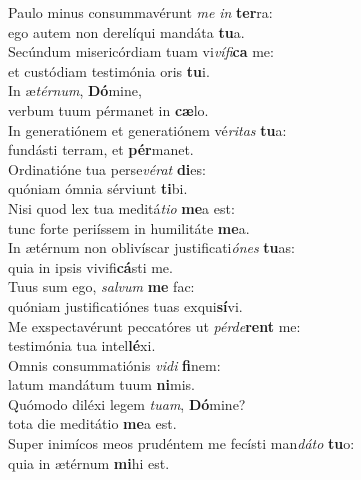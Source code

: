 \oddverse Paulo minus consummavérunt \textit{me} \textit{in} \textbf{ter}ra:~\*\\
\oddverse ego autem non derelíqui mandáta \textbf{tu}a.\\
\evenverse Secúndum misericórdiam tuam vi\textit{ví}\textit{fi}\textbf{ca} me:~\*\\
\evenverse et custódiam testimónia oris \textbf{tu}i.\\
\oddverse In æ\textit{tér}\textit{num}, \textbf{Dó}mine,~\*\\
\oddverse verbum tuum pérmanet in \textbf{cæ}lo.\\
\evenverse In generatiónem et generatiónem vé\textit{ri}\textit{tas} \textbf{tu}a:~\*\\
\evenverse fundásti terram, et \textbf{pér}manet.\\
\oddverse Ordinatióne tua perse\textit{vé}\textit{rat} \textbf{di}es:~\*\\
\oddverse quóniam ómnia sérviunt \textbf{ti}bi.\\
\evenverse Nisi quod lex tua meditá\textit{ti}\textit{o} \textbf{me}a est:~\*\\
\evenverse tunc forte periíssem in humilitáte \textbf{me}a.\\
\oddverse In ætérnum non oblivíscar justificati\textit{ó}\textit{nes} \textbf{tu}as:~\*\\
\oddverse quia in ipsis vivifi\textbf{cá}sti me.\\
\evenverse Tuus sum ego, \textit{sal}\textit{vum} \textbf{me} fac:~\*\\
\evenverse quóniam justificatiónes tuas exqui\textbf{sí}vi.\\
\oddverse Me exspectavérunt peccatóres ut \textit{pér}\textit{de}\textbf{rent} me:~\*\\
\oddverse testimónia tua intel\textbf{lé}xi.\\
\evenverse Omnis consummatiónis \textit{vi}\textit{di} \textbf{fi}nem:~\*\\
\evenverse latum mandátum tuum \textbf{ni}mis.\\
\oddverse Quómodo diléxi legem \textit{tu}\textit{am}, \textbf{Dó}mine?~\*\\
\oddverse tota die meditátio \textbf{me}a est.\\
\evenverse Super inimícos meos prudéntem me fecísti man\textit{dá}\textit{to} \textbf{tu}o:~\*\\
\evenverse quia in ætérnum \textbf{mi}hi est.\\
